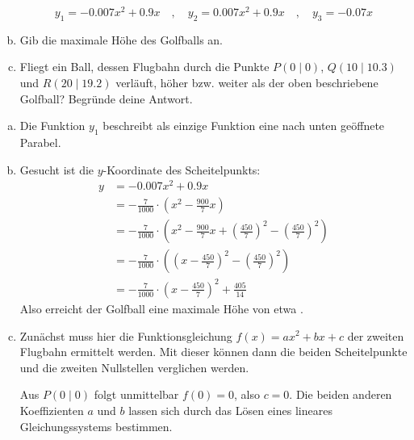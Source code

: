 \begin{exercise}
\begin{enumerate}[a)]
            \begin{equation*}
                y_1=\num{-0.007}x^2+\num{0.9}x
                \quad,\quad
                y_2=\num{0.007}x^2+\num{0.9}x
                \quad,\quad
                y_3=\num{-0.07}x
            \end{equation*}
      \item Gib die maximale Höhe des Golfballs an.
      \item Fliegt ein Ball, dessen Flugbahn durch die Punkte
            $P(0\mid0)$, $Q(10\mid\num{10.3})$ und $R(20\mid\num{19.2})$
            verläuft, höher bzw. weiter als der oben beschriebene Golfball?
            Begründe deine Antwort.
    \end{enumerate}
  \fi
  \ifoutcome\outcome
    \begin{enumerate}[a)]
      \item Die Funktion $y_1$ beschreibt als einzige Funktion eine nach
            unten geöffnete Parabel.
      \item Gesucht ist die $y$-Koordinate des Scheitelpunkts:
        \begin{equation*}
          \begin{split}
            y&=\num{-0.007}x^2+\num{0.9}x\\
             &=-\frac{7}{1000}\cdot\left(x^2-\frac{900}{7}x\right)\\
             &=-\frac{7}{1000}\cdot\left(x^2-\frac{900}{7}x+\left(\frac{450}{7}\right)^2-\left(\frac{450}{7}\right)^2\right)\\
             &=-\frac{7}{1000}\cdot\left(\left(x-\frac{450}{7}\right)^2-\left(\frac{450}{7}\right)^2\right)\\
             &=-\frac{7}{1000}\cdot\left(x-\frac{450}{7}\right)^2+\frac{405}{14}
          \end{split}
        \end{equation*}
        Also erreicht der Golfball eine maximale Höhe von etwa .
      \item Zunächst muss hier die Funktionsgleichung $f(x)=ax^2+bx+c$ der zweiten Flugbahn
            ermittelt werden. Mit dieser können dann die beiden Scheitelpunkte
            und die zweiten Nullstellen verglichen werden.\par
            Aus $P(0\mid0)$ folgt unmittelbar $f(0)=0$, also $c=0$.
            Die beiden anderen Koeffizienten $a$ und $b$ lassen sich durch
            das Lösen eines lineares Gleichungssystems bestimmen.
            \begin{equation*}

\end{equation*}
\end{enumerate}
\end{exercise}
